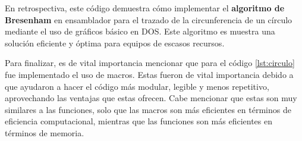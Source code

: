 	En retrospectiva, este código demuestra cómo implementar el \textbf{algoritmo
	de Bresenham} en ensamblador para el trazado de la circunferencia de un
	círculo mediante el uso de gráficos básico en DOS. Este algoritmo es muestra
	una solución eficiente y óptima para equipos de escasos recursos.

	Para finalizar, es de vital importancia mencionar que para el código
	\ref{lst:circulo} fue implementado el uso de macros. Estas fueron de vital
	importancia debido a que ayudaron a hacer el código más modular, legible y
	menos repetitivo, aprovechando las ventajas que estas ofrecen. Cabe mencionar
	que estas son muy similares a las funciones, solo que las macros son más
	eficientes en términos de eficiencia computacional, mientras que las
	funciones son más eficientes en términos de memoria.


	\nocite{*} %

	\clearpage
	

	


